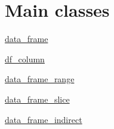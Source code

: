 \hypertarget{index_main_classes}{}\section{Main classes}\label{index_main_classes}

\begin{DoxyItemize}
\item \hyperlink{classboost_1_1numeric_1_1ublas_1_1data__frame}{data\+\_\+frame }
\item \hyperlink{classboost_1_1numeric_1_1ublas_1_1df__column}{df\+\_\+column }
\item \hyperlink{classboost_1_1numeric_1_1ublas_1_1data__frame__range}{data\+\_\+frame\+\_\+range }
\item \hyperlink{classboost_1_1numeric_1_1ublas_1_1data__frame__slice}{data\+\_\+frame\+\_\+slice }
\item \hyperlink{classboost_1_1numeric_1_1ublas_1_1data__frame__indirect}{data\+\_\+frame\+\_\+indirect } 
\end{DoxyItemize}